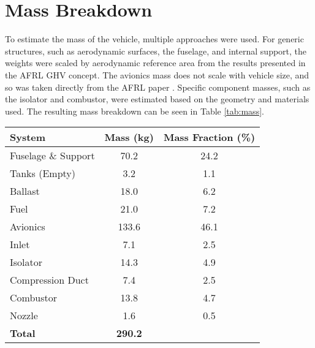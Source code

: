 \section{Mass Breakdown}

To estimate the mass of the vehicle, multiple approaches were used. For generic structures, such as aerodynamic surfaces, the fuselage, and internal support, the weights were scaled by aerodynamic reference area from the results presented in the AFRL GHV concept. The avionics mass does not scale with vehicle size, and so was taken directly from the AFRL paper \cite{ghv}. Specific component masses, such as the isolator and combustor, were estimated based on the geometry and materials used. The resulting mass breakdown can be seen in Table \ref{tab:mass}.

\begin{center}
\begin{tabular}{l c c}
System & Mass (kg) & Mass Fraction (\%)\\
\hline
Fuselage \& Support & 70.2 & 24.2\\
Tanks (Empty) & 3.2 & 1.1\\
Ballast & 18.0 & 6.2 \\
Fuel & 21.0 & 7.2 \\
Avionics & 133.6 & 46.1 \\
Inlet & 7.1 & 2.5 \\
Isolator & 14.3 & 4.9 \\
Compression Duct & 7.4 & 2.5 \\
Combustor & 13.8 & 4.7 \\
Nozzle & 1.6 & 0.5 \\
\hline
\textbf{Total} & \textbf{290.2}
\label{tab:mass}
\end{tabular}
\end{center}
